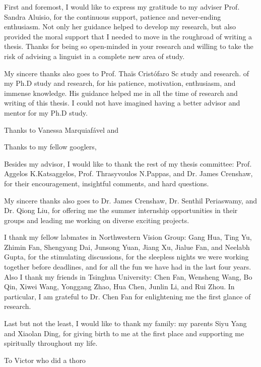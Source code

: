 
\begin{acknowledgements}

First and foremost, I would like to express my gratitude to my adviser Prof. Sandra Aluisio, for the continuous support, patience and never-ending enthusiasm. Not only her guidance helped to develop my research, but also provided the moral support that I needed to move in the roughroad of writing a thesis. Thanks for being so open-minded in your research and willing to take the risk of advising a linguist in a complete new area of study.

My sincere thanks also goes to Prof. Tha\"is Crist\'ofaro
Sc study and research.  of my Ph.D study and research, for his patience, motivation, enthusiasm, and immense knowledge. His guidance helped me in all the time of research and writing of this thesis. I could not have imagined having a better advisor and mentor for my Ph.D study.

Thanks to Vanessa Marquiaf\'avel and 

Thanks to my fellow googlers,

Besides my advisor, I would like to thank the rest of my thesis committee: Prof. Aggelos K.Katsaggelos, Prof. Thrasyvoulos N.Pappas, and Dr. James Crenshaw, for their encouragement, insightful comments, and hard questions.

My sincere thanks also goes to Dr. James Crenshaw, Dr. Senthil Periaswamy, and Dr. Qiong Liu, for offering me the summer internship opportunities in their groups and leading me working on diverse exciting projects.

I thank my fellow labmates in Northwestern Vision Group: Gang Hua, Ting Yu, Zhimin Fan, Shengyang Dai, Junsong Yuan, Jiang Xu, Jialue Fan, and Neelabh Gupta, for the stimulating discussions, for the sleepless nights we were working together before deadlines, and for all the fun we have had in the last four years. Also I thank my friends in Tsinghua University: Chen Fan, Wensheng Wang, Bo Qin, Xiwei Wang, Yonggang Zhao, Hua Chen, Junlin Li, and Rui Zhou. In particular, I am grateful to Dr. Chen Fan for enlightening me the first glance of research.

Last but not the least, I would like to thank my family: my parents Siyu Yang and Xiaolan Ding, for giving birth to me at the first place and supporting me spiritually throughout my life.

To Victor who did a thoro


\end{acknowledgements}

